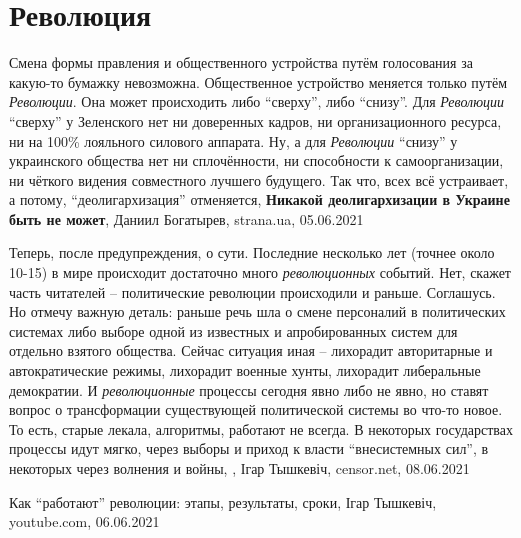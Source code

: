  
 
 
 
 
\chapter{Революция}

Смена формы правления и общественного устройства путём голосования за какую-то
бумажку невозможна. Общественное устройство меняется только путём
\emph{Революции}. Она может происходить либо \enquote{сверху}, либо
\enquote{снизу}. Для \emph{Революции} \enquote{сверху} у Зеленского нет ни
доверенных кадров, ни организационного ресурса, ни на 100\% лояльного силового
аппарата. Ну, а для \emph{Революции} \enquote{снизу} у украинского общества нет
ни сплочённости, ни способности к самоорганизации, ни чёткого видения
совместного лучшего будущего. Так что, всех всё устраивает, а потому,
\enquote{деолигархизация} отменяется,
\textbf{Никакой деолигархизации в Украине быть не может},
Даниил Богатырев, strana.ua, 05.06.2021

Теперь, после предупреждения, о сути. Последние несколько лет (точнее около
10-15) в мире происходит достаточно много \emph{революционных} событий. Нет,
скажет часть читателей – политические революции происходили и раньше.
Соглашусь. Но отмечу важную деталь: раньше речь шла о смене персоналий в
политических системах либо выборе одной из известных и апробированных систем
для отдельно взятого общества. Сейчас ситуация иная – лихорадит авторитарные и
автократические режимы, лихорадит военные хунты, лихорадит либеральные
демократии.  И \emph{революционные} процессы сегодня явно либо не явно, но
ставят вопрос о трансформации существующей политической системы во что-то
новое. То есть, старые лекала, алгоритмы, работают не всегда. В некоторых
государствах процессы идут мягко, через выборы и приход к власти
\enquote{внесистемных сил}, в некоторых через волнения и войны,
, Ігар Тышкевіч, censor.net, 08.06.2021

Как \enquote{работают} революции: этапы, результаты, сроки, Ігар Тышкевіч, youtube.com, 06.06.2021

